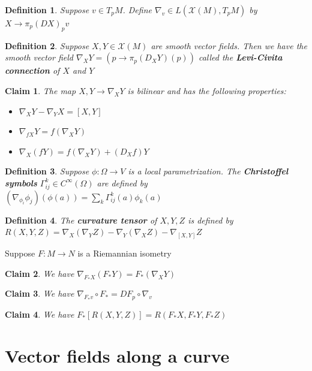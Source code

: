 \documentclass{article}
\newtheorem{definition}{Definition}
\newtheorem{claim}{Claim}
\begin{document}
\begin{definition}
    Suppose $v \in T_pM$. Define $\nabla_v \in L(\mathcal{X}(M),T_pM)$ by $X \to \pi_p (DX)_p v$
\end{definition}



\begin{definition}
    Suppose $X,Y \in \mathcal{X}(M)$ are smooth vector fields. Then we have the smooth vector field $\nabla_XY=(p \to \pi_p (D_XY)(p))$ called the \textbf{Levi-Civita connection} of $X$ and $Y$
\end{definition}

\begin{claim}
    The map $X,Y \to \nabla_XY$ is bilinear and has the following properties:
    \begin{itemize}
        \item $\nabla_XY-\nabla_YX = [X,Y]$
        \item $\nabla_{fX}Y=f(\nabla_XY)$
        \item $\nabla_X(fY)=f(\nabla_XY) + (D_Xf)Y$
    \end{itemize}
\end{claim}

\begin{definition}
    Suppose $\phi: \Omega \to V$ is a local parametrization. The \textbf{Christoffel symbols} $\Gamma_{ij}^k \in C^\infty(\Omega)$ are defined by $(\nabla_{\phi_i}\phi_j)(\phi(a)) = \sum_k \Gamma_{ij}^k(a) \phi_k(a)$
\end{definition}

\begin{definition}
    The \textbf{curvature tensor} of $X,Y,Z$ is defined by $R(X,Y,Z)=\nabla_X(\nabla_YZ)-\nabla_Y(\nabla_XZ)-\nabla_{[X,Y]}Z$
\end{definition}

Suppose $F:M \to N$ is a Riemannian isometry

\begin{claim}
    We have $\nabla_{F_*X}(F_*Y)=F_*(\nabla_XY)$
\end{claim}

\begin{claim}
    We have $\nabla_{F_*v} \circ F_* = DF_p \circ \nabla_v$
\end{claim}

\begin{claim}
    We have $F_*[R(X,Y,Z)]=R(F_*X,F_*Y,F_*Z)$
\end{claim}

\section{Vector fields along a curve}
\end{document}
